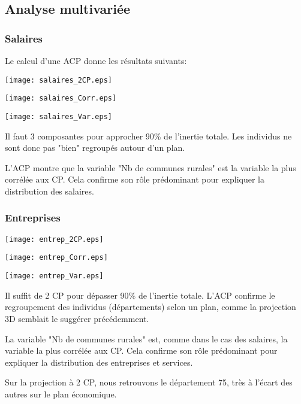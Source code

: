 \documentclass[a4paper,11pt]{article}
\begin{document}
\subsection{Analyse multivariée}

\subsubsection{Salaires}
Le calcul d'une ACP donne les résultats suivants:
\begin{center}
\texttt{[image: salaires\_2CP.eps]}
\end{center}
\begin{center}
\texttt{[image: salaires\_Corr.eps]}
\end{center}
\begin{center}
\texttt{[image: salaires\_Var.eps]}
\end{center}

Il faut 3 composantes  pour approcher 90\% de l'inertie totale.
Les individus ne sont donc pas "bien" regroupés autour d'un plan.

L'ACP montre que la variable "Nb de communes rurales" est la variable la plus corrélée aux CP.
Cela confirme son rôle prédominant pour expliquer la distribution des salaires.

\subsubsection{Entreprises}
\begin{center}
\texttt{[image: entrep\_2CP.eps]}
\end{center}
\begin{center}
\texttt{[image: entrep\_Corr.eps]}
\end{center}
\begin{center}
\texttt{[image: entrep\_Var.eps]}
\end{center}

Il suffit de 2 CP pour dépasser 90\% de l'inertie totale.
L'ACP confirme le regroupement des individus (départements) selon un plan, comme la projection 3D semblait le suggérer précédemment.

La variable "Nb de communes rurales" est, comme dans le cas des salaires, la variable la plus corrélée aux CP.
Cela confirme son rôle prédominant pour expliquer la distribution des entreprises et services.

Sur la projection à 2 CP, nous retrouvons le département 75, très à l'écart des autres sur le plan économique.
\end{document}
